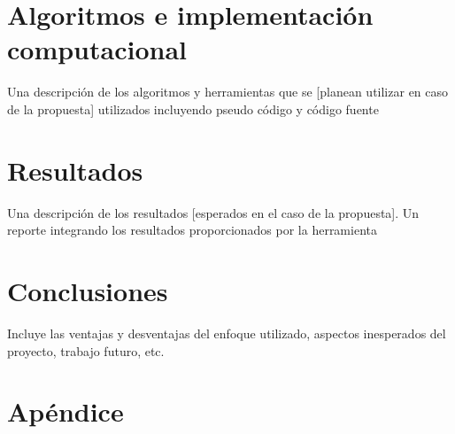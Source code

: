 \documentclass[a4paper]{article}
\begin{document}
\vspace*{0.2in}


\section{Algoritmos e implementación computacional}
Una descripción de los algoritmos y herramientas que se [planean utilizar en caso de la propuesta] utilizados incluyendo pseudo código y código fuente
\section{Resultados}
Una descripción de los resultados [esperados en el caso de la propuesta]. Un reporte integrando los resultados proporcionados por la herramienta
\section{Conclusiones}
Incluye las ventajas y desventajas del enfoque utilizado, aspectos inesperados del proyecto, trabajo futuro, etc.
\section{Apéndice}
\end{document}
